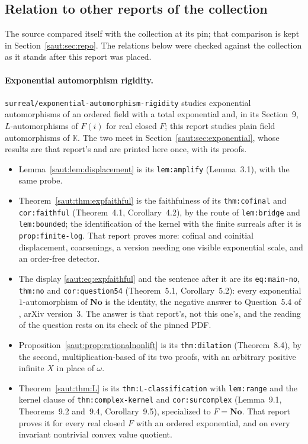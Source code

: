 \documentclass[11pt]{article}
\theoremstyle{definition}
\theoremstyle{remark}
\newcommand{\No}{\mathbf{No}}
\newcommand{\K}{\mathbb K}
\newcommand{\repo}[1]{\nolinkurl{#1}}%
\newcommand{\lbl}[1]{\nolinkurl{#1}}%
\numberwithin{equation}{section}
\begin{document}
\subsection{Relation to other reports of the collection}\label{saut:sec:position}

The source compared itself with the collection at its pin; that comparison
is kept in Section~\ref{saut:sec:repo}. The relations below were checked
against the collection as it stands after this report was placed.

\paragraph{Exponential automorphism rigidity.}
\repo{surreal/exponential-automorphism-rigidity} studies exponential
automorphisms of an ordered field with a total exponential and, in its
Section~9, $L$-automorphisms of $F(i)$ for real closed $F$; this report
studies plain field automorphisms of $\K$. The two meet in
Section~\ref{saut:sec:exponential}, whose results are that report's and
are printed here once, with its proofs.
\begin{itemize}
\item Lemma~\ref{saut:lem:displacement} is its \lbl{lem:amplify}
(Lemma~3.1), with the same probe.
\item Theorem~\ref{saut:thm:expfaithful} is the faithfulness of its
\lbl{thm:cofinal} and \lbl{cor:faithful} (Theorem~4.1, Corollary~4.2), by
the route of \lbl{lem:bridge} and \lbl{lem:bounded}; the identification of
the kernel with the finite surreals after it is \lbl{prop:finite-log}.
That report proves more: cofinal and coinitial
displacement, coarsenings, a version needing one visible exponential scale,
and an order-free detector.
\item The display \eqref{saut:eq:expfaithful} and the sentence after it are
its \lbl{eq:main-no}, \lbl{thm:no} and \lbl{cor:question54}
(Theorem~5.1, Corollary~5.2): every
exponential $1$-automorphism of $\No$ is the identity, the negative answer
to Question~5.4 of \cite{KKS}, arXiv version~3. The answer is that report's,
not this one's, and the reading of the question rests on its check of the
pinned PDF.
\item Proposition~\ref{saut:prop:rationalnonlift} is its \lbl{thm:dilation}
(Theorem~8.4), by the second, multiplication-based of its two proofs, with
an arbitrary positive infinite $X$ in place of $\omega$.
\item Theorem~\ref{saut:thm:L} is its \lbl{thm:L-classification} with
\lbl{lem:range} and the kernel clause of \lbl{thm:complex-kernel} and
\lbl{cor:surcomplex} (Lemma~9.1, Theorems~9.2 and~9.4, Corollary~9.5),
specialized to $F=\No$. That report proves it for every real closed $F$
with an ordered exponential, and on every invariant nontrivial convex value
quotient.
\end{itemize}
\end{document}
